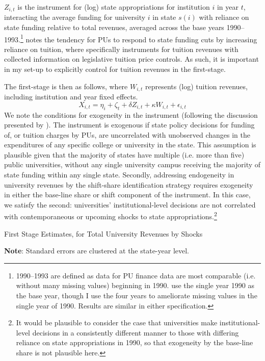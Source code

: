\documentclass[notitlepage,12pt]{article}
\begin{document}
$Z_{i,t}$ is the instrument for (log) state appropriations for institution $i$ in year $t$, interacting the average funding for university $i$ in state $s(i)$ with reliance on state funding relative to total revenues, averaged across the base years 1990--1993.\footnote{
    1990--1993 are defined as data for PU finance data are most comparable (i.e. without many missing values) beginning in 1990.
    \cite{NBERw23736} use the single year 1990 as the base year, though I use the four years to ameliorate missing values in the single year of 1990.
    Results are similar in either specification.
}
\cite{NBERw27885} notes the tendency for PUs to respond to state funding cuts by increasing reliance on tuition, where \cite{NBERw23736} specifically instruments for tuition revenues with collected information on legislative tuition price controls.
As such, it is important in my set-up to explicitly control for tuition revenues in the first-stage.

The first-stage is then as follows, where $W_{i,t}$ represents (log) tuition revenues, including institution and year fixed effects.
\begin{equation}
    \label{eqn:firststage}
    X_{i,t} = \eta_i + \zeta_t + \delta Z_{i,t} + \kappa W_{i,t} + \epsilon_{i,t}
\end{equation}
We note the conditions for exogeneity in the instrument (following the discussion presented by \citealt{NBERw27885}).
The instrument is exogenous if state policy decisions for funding of, or tuition charges by PUs, are uncorrelated with unobserved changes in the expenditures of any specific college or university in the state.
This assumption is plausible given that the majority of states have multiple (i.e. more than five) public universities, without any single university campus receiving the majority of state funding within any single state.
Secondly, addressing endogeneity in university revenues by the shift-share identification strategy requires exogeneity in either the base-line share or shift component of the instrument.
In this case, we satisfy the second: universities' institutional-level decisions are not correlated with contemporaneous or upcoming shocks to state appropriations.\footnote{
    It would be plausible to consider the case that universities make institutional-level decisions in a consistently different manner to those 
    with differing reliance on state appropriations in 1990, so that exogeneity by the base-line share is not plausible here.
}

\begin{table}[!h]
    \onehalfspacing
    \centering
    \caption{First Stage Estimates, for Total University Revenues by Shocks}
    \makebox[\textwidth][c]{}
    \label{tab:firststage-reg}
    \begin{flushleft}
        \footnotesize
        \textbf{Note}: Standard errors are clustered at the state-year level.
    \end{flushleft}
\end{table}
\end{document}
